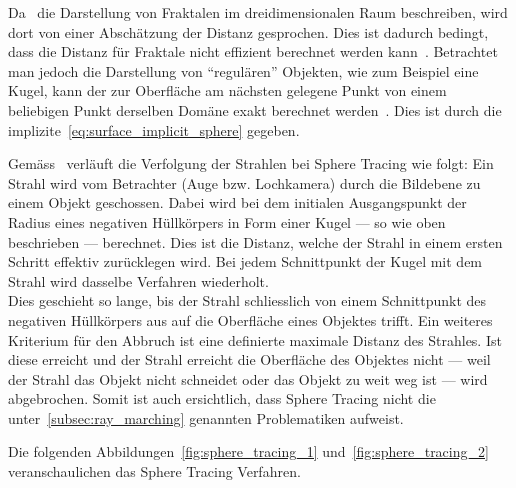 Da~\citeauthor{hart_ray_1989} die Darstellung von Fraktalen im
dreidimensionalen Raum beschreiben, wird dort von einer Abschätzung der
Distanz gesprochen. Dies ist dadurch bedingt, dass die Distanz für
Fraktale nicht effizient berechnet werden kann~\parencite[S.
291]{hart_ray_1989}. Betrachtet man jedoch die Darstellung von
``regulären'' Objekten, wie zum Beispiel eine Kugel, kann der zur
Oberfläche am nächsten gelegene Punkt von einem beliebigen Punkt
derselben Domäne exakt berechnet werden~\parencite[S.
530]{hart_sphere_1994}. Dies ist durch die
implizite~\autoref{eq:surface_implicit_sphere} gegeben.

Gemäss~\cite[S. 291 - 292]{hart_ray_1989} verläuft die Verfolgung der
Strahlen bei Sphere Tracing wie folgt: Ein Strahl wird vom Betrachter
(Auge bzw.  Lochkamera) durch die Bildebene zu einem Objekt geschossen.
Dabei wird bei dem initialen Ausgangspunkt der Radius eines negativen
Hüllkörpers in Form einer Kugel --- so wie oben beschrieben ---
berechnet. Dies ist die Distanz, welche der Strahl in einem ersten
Schritt effektiv zurücklegen wird. Bei jedem Schnittpunkt der Kugel mit
dem Strahl wird dasselbe Verfahren wiederholt.\\
Dies geschieht so lange, bis der Strahl schliesslich von einem
Schnittpunkt des negativen Hüllkörpers aus auf die Oberfläche eines
Objektes trifft.  Ein weiteres Kriterium für den Abbruch ist eine definierte
maximale Distanz des Strahles. Ist diese erreicht und der Strahl
erreicht die Oberfläche des Objektes nicht --- weil der Strahl das
Objekt nicht schneidet oder das Objekt zu weit weg ist --- wird
abgebrochen. Somit ist auch ersichtlich, dass Sphere Tracing nicht die
unter~\ref{subsec:ray_marching} genannten Problematiken aufweist.

Die folgenden Abbildungen~\ref{fig:sphere_tracing_1}
und~\ref{fig:sphere_tracing_2} veranschaulichen das Sphere Tracing
Verfahren.

